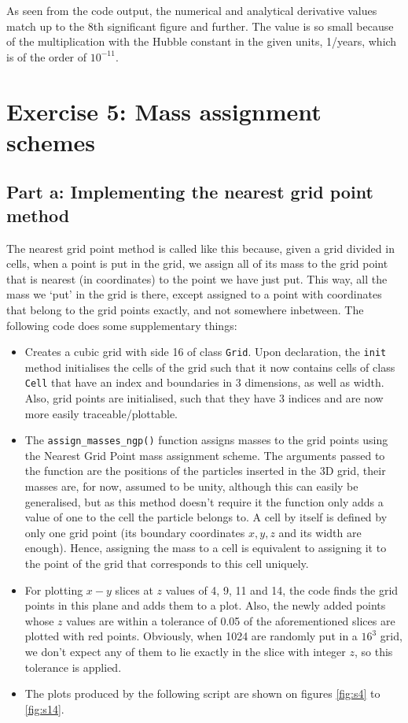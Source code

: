 \documentclass{article}
\begin{document}
As seen from the code output, the numerical and analytical derivative values match up to the 8th significant figure and further. The value is so small because of the multiplication with the Hubble constant in the given units, 1/years, which is of the order of $10^{-11}$.

\section{Exercise 5: Mass assignment schemes}
\subsection{Part a: Implementing the nearest grid point method}
The nearest grid point method is called like this because, given a grid divided in cells, when a point is put in the grid, we assign all of its mass to the grid point that is nearest (in coordinates) to the point we have just put. This way, all the mass we `put' in the grid is there, except assigned to a point with coordinates that belong to the grid points exactly, and not somewhere inbetween. The following code does some supplementary things:
\begin{itemize}
    \item Creates a cubic grid with side 16 of class \verb+Grid+. Upon declaration, the \verb+init+ method initialises the cells of the grid such that it now contains cells of class \verb+Cell+ that have an index and boundaries in 3 dimensions, as well as width. Also, grid points are initialised, such that they have 3 indices and are now more easily traceable/plottable. 
    \item The \verb+assign_masses_ngp()+ function assigns masses to the grid points using the Nearest Grid Point mass assignment scheme. The arguments passed to the function are the positions of the particles inserted in the 3D grid, their masses are, for now, assumed to be unity, although this can easily be generalised, but as this method doesn't require it the function only adds a value of one to the cell the particle belongs to. A cell by itself is defined by only one grid point (its boundary coordinates $x, y, z$ and its width are enough). Hence, assigning the mass to a cell is equivalent to assigning it to the point of the grid that corresponds to this cell uniquely.
    \item For plotting $x-y$ slices at $z$ values of 4, 9, 11 and 14, the code finds the grid points in this plane and adds them to a plot. Also, the newly added points whose $z$ values are within a tolerance of 0.05 of the aforementioned slices are plotted with red points. Obviously, when 1024 are randomly put in a $16^3$ grid, we don't expect any of them to lie exactly in the slice with integer $z$, so this tolerance is applied.
    \item The plots produced by the following script are shown on figures \ref{fig:s4} to \ref{fig:s14}.
\end{itemize}
\end{document}

